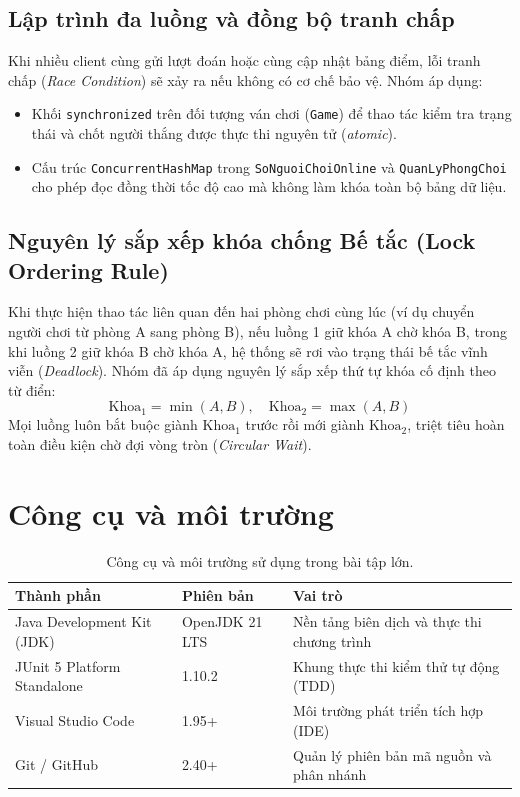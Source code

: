 \documentclass[12pt,a4paper,oneside]{report}
\begin{document}
\subsection{Lập trình đa luồng và đồng bộ tranh chấp}
Khi nhiều client cùng gửi lượt đoán hoặc cùng cập nhật bảng điểm, lỗi tranh chấp (\textit{Race Condition}) sẽ xảy ra nếu không có cơ chế bảo vệ. Nhóm áp dụng:
\begin{itemize}
  \item Khối \texttt{synchronized} trên đối tượng ván chơi (\texttt{Game}) để thao tác kiểm tra trạng thái và chốt người thắng được thực thi nguyên tử (\textit{atomic}).
  \item Cấu trúc \texttt{ConcurrentHashMap} trong \texttt{SoNguoiChoiOnline} và \texttt{QuanLyPhongChoi} cho phép đọc đồng thời tốc độ cao mà không làm khóa toàn bộ bảng dữ liệu.
\end{itemize}

\subsection{Nguyên lý sắp xếp khóa chống Bế tắc (Lock Ordering Rule)}
Khi thực hiện thao tác liên quan đến hai phòng chơi cùng lúc (ví dụ chuyển người chơi từ phòng A sang phòng B), nếu luồng 1 giữ khóa A chờ khóa B, trong khi luồng 2 giữ khóa B chờ khóa A, hệ thống sẽ rơi vào trạng thái bế tắc vĩnh viễn (\textit{Deadlock}). Nhóm đã áp dụng nguyên lý sắp xếp thứ tự khóa cố định theo từ điển:
\begin{equation}
\text{Khoa}_1 = \min(A, B), \quad \text{Khoa}_2 = \max(A, B)
\end{equation}
Mọi luồng luôn bắt buộc giành $\text{Khoa}_1$ trước rồi mới giành $\text{Khoa}_2$, triệt tiêu hoàn toàn điều kiện chờ đợi vòng tròn (\textit{Circular Wait}).

\section{Công cụ và môi trường}
\begin{table}[ht]
\centering
\caption{Công cụ và môi trường sử dụng trong bài tập lớn.}
\begin{tabular}{lll}
\toprule
\textbf{Thành phần} & \textbf{Phiên bản} & \textbf{Vai trò} \\
\midrule
Java Development Kit (JDK) & OpenJDK 21 LTS & Nền tảng biên dịch và thực thi chương trình \\
JUnit 5 Platform Standalone & 1.10.2 & Khung thực thi kiểm thử tự động (TDD) \\
Visual Studio Code & 1.95+ & Môi trường phát triển tích hợp (IDE) \\
Git / GitHub & 2.40+ & Quản lý phiên bản mã nguồn và phân nhánh \\
\bottomrule
\end{tabular}
\end{table}
\end{document}
